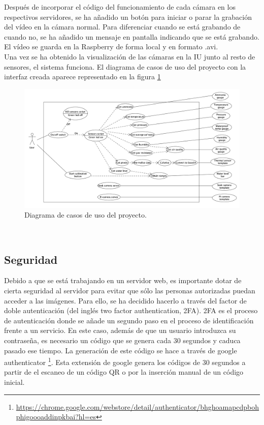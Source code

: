 Después de incorporar el código del funcionamiento de cada cámara en los respectivos servidores, se ha añadido un botón para iniciar o parar la grabación del vídeo en la cámara normal. Para diferenciar cuando se está grabando de cuando no, se ha añadido un mensaje en pantalla indicando que se está grabando. El vídeo se guarda en la Raspberry de forma local y en formato .avi.\\

Una vez se ha obtenido la visualización de las cámaras en la IU junto al resto de sensores, el sistema funciona. El diagrama de casos de uso del proyecto con la interfaz creada aparece representado en la figura \ref{fig:casos}
\begin{figure} [h!]
  \begin{center}
    \includegraphics[width=17cm]{figs/casos}
  \end{center}
  \caption{Diagrama de casos de uso del proyecto.}
  \label{fig:casos}
\end{figure}\\

\subsection{Seguridad}
Debido a que se está trabajando en un servidor web, es importante dotar de cierta seguridad al servidor para evitar que sólo las personas autorizadas puedan acceder a las imágenes. Para ello, se ha decidido hacerlo a través del factor de doble autenticación (del inglés two factor authentication, 2FA). 2FA es el proceso de autenticación donde se añade un segundo paso en el proceso de identificación frente a un servicio. En este caso, además de que un usuario introduzca su contraseña, es necesario un código que se genera cada 30 segundos y caduca pasado ese tiempo. La generación de este código se hace a través de google authenticator \footnote{\url{https://chrome.google.com/webstore/detail/authenticator/bhghoamapcdpbohphigoooaddinpkbai?hl=es}}. Esta extensión de google genera los códigos de 30 segundos a partir de el escaneo de un código QR o por la inserción manual de un código inicial.\\

